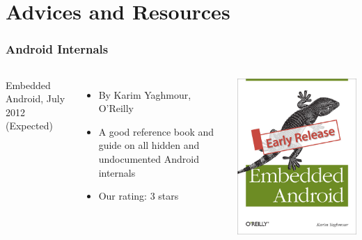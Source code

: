 \section{Advices and Resources}

\begin{frame}
  \frametitle{Android Internals}
  \begin{columns}
    Embedded Android, July 2012 (Expected)
    \begin{itemize}
    \item By Karim Yaghmour, O'Reilly
    \item A good reference book and guide on all hidden and
      undocumented Android internals
    \item Our rating: 3 stars
    \end{itemize}
    \includegraphics[width=\textwidth]{slides/android-resources/embedded-android.jpg}
  \end{columns}
\end{frame}

